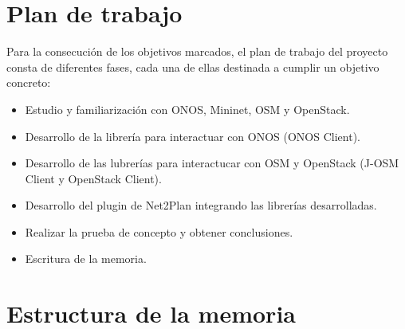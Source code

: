 \section{Plan de trabajo}

Para la consecución de los objetivos marcados, el plan de trabajo del proyecto consta de diferentes fases, cada una de ellas destinada a cumplir un objetivo concreto:

\begin{itemize}
	\item Estudio y familiarización con ONOS, Mininet, OSM y OpenStack.
	\item Desarrollo de la librería para interactuar con ONOS (ONOS Client).
	\item Desarrollo de las lubrerías para interactucar con OSM y OpenStack (J-OSM Client y OpenStack Client).
	\item Desarrollo del plugin de Net2Plan integrando las librerías desarrolladas.
	\item Realizar la prueba de concepto y obtener conclusiones.
	\item Escritura de la memoria.
\end{itemize}

\section{Estructura de la memoria}

